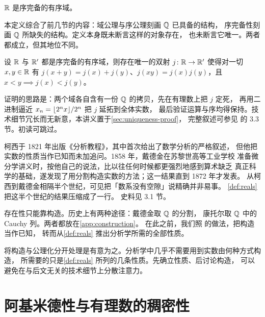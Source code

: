 \begin{definition}[实数系]
  \label{def:reals}
   \(\mathbb{R}\) 是序完备的有序域。
\end{definition}

本定义综合了前几节的内容：域公理与序公理刻画 \(\mathbb{Q}\) 已具备的结构，
序完备性刻画 \(\mathbb{Q}\) 所缺失的结构。定义本身既未断言这样的对象存在，
也未断言它唯一。两者都成立，但其地位不同。

\begin{theorem}
  \label{thm:uniqueness}
  设 \(\mathbb{R}\) 与 \(\mathbb{R}'\) 都是序完备的有序域，则存在唯一的双射
  \(j \colon \mathbb{R} \to \mathbb{R}'\) 使得对一切 \(x, y \in \mathbb{R}\) 有
  \(j(x + y) = j(x) + j(y)\)、\(j(xy) = j(x)j(y)\)，且 \(x < y \implies j(x) < j(y)\)。
\end{theorem}

\begin{remark}
  证明的思路是：两个域各自含有一份 \(\mathbb{Q}\) 的拷贝，先在有理数上把 \(j\) 定死，
  再用二进制逼近 \(x_{n} = \lfloor2^{n}x\rfloor/2^{n}\) 把 \(j\) 延拓到全体实数，
  最后验证运算与序均得保持。技术细节冗长而无新意，本讲义置于\cref{sec:uniqueness-proof}，
  完整叙述可参见\textcite{garling2013} 的 3.3 节。初读可跳过。
\end{remark}

\begin{remark}[一段史实]
  柯西于 1821 年出版《分析教程》，其中首次给出了数学分析的严格叙述，
  但他把实数的性质当作已知而未加追问。1858 年，戴德金在苏黎世高等工业学校
  准备微分学讲义时，按他自己的说法，比以往任何时候都更强烈地感到算术缺乏
  真正科学的基础，遂发现了用分割构造实数的方法；这一结果直到 1872 年才发表。
  从柯西到戴德金相隔半个世纪，可见把「数系没有空隙」说精确并非易事。
  \cref{def:reals} 把这半个世纪的结果压缩成了一行。
  史料见\textcite{garling2013} 3.1 节。
\end{remark}

存在性只能靠构造。历史上有两种途径：戴德金取 \(\mathbb{Q}\) 的分割，
康托尔取 \(\mathbb{Q}\) 中的 Cauchy 列。两者都放在\cref{app:construction}。
在此之前，我们照\textcite{amann2005} 的做法，把构造当作已知，
转而从\cref{def:reals} 推出分析学所需的全部性质。

\begin{intuition}
  将构造与公理化分开处理是有意为之。分析学中几乎不需要用到实数由何种方式构造，
  所需要的只是\cref{def:reals} 所列的几条性质。先确立性质、后讨论构造，
  可以避免在与后文无关的技术细节上分散注意力。
\end{intuition}

\section{阿基米德性与有理数的稠密性}
\label{sec:archimedean}

